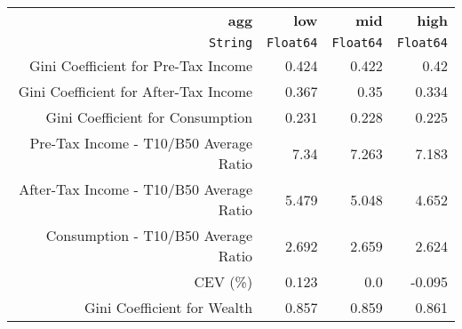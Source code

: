 \begin{tabular}{rrrr}
  \hline
  \textbf{agg} & \textbf{low} & \textbf{mid} & \textbf{high} \\
  \texttt{String} & \texttt{Float64} & \texttt{Float64} & \texttt{Float64} \\\hline
  Gini Coefficient for Pre-Tax Income & 0.424 & 0.422 & 0.42 \\
  Gini Coefficient for After-Tax Income & 0.367 & 0.35 & 0.334 \\
  Gini Coefficient for Consumption & 0.231 & 0.228 & 0.225 \\
  Pre-Tax Income - T10/B50 Average Ratio & 7.34 & 7.263 & 7.183 \\
  After-Tax Income - T10/B50 Average Ratio & 5.479 & 5.048 & 4.652 \\
  Consumption - T10/B50 Average Ratio & 2.692 & 2.659 & 2.624 \\
  CEV (\%) & 0.123 & 0.0 & -0.095 \\
  Gini Coefficient for Wealth & 0.857 & 0.859 & 0.861 \\\hline
\end{tabular}
